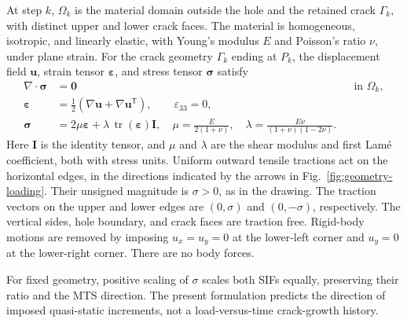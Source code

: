 \documentclass[11pt]{article}
\begin{document}
At step $k$, $\Omega_k$ is the material domain outside the hole and the
retained crack $\Gamma_k$, with distinct upper and lower crack faces.
The material is homogeneous, isotropic, and linearly elastic,
with Young's modulus $E$ and Poisson's ratio $\nu$, under plane
strain. For the crack geometry $\Gamma_k$ ending at $P_k$, the
displacement field $\bm u$, strain tensor $\bm\varepsilon$, and stress
tensor $\bm\sigma$ satisfy
\begin{align}
 \nabla\!\cdot\bm{\sigma}&=\bm0 &&\text{in }\Omega_k,\label{eq:equilibrium}\\
 \bm{\varepsilon}&=\tfrac12(\nabla\bm u+\nabla\bm u^{\mathsf T}),\qquad
 \varepsilon_{33}=0,\label{eq:strain}\\
 \bm{\sigma}&=2\mu\bm{\varepsilon}
       +\lambda\,\operatorname{tr}(\bm{\varepsilon})\bm I,
 \quad \mu=\frac{E}{2(1+\nu)},\quad
 \lambda=\frac{E\nu}{(1+\nu)(1-2\nu)}.\label{eq:constitutive}
\end{align}
Here $\bm I$ is the identity tensor, and $\mu$ and $\lambda$ are the
shear modulus and first Lam\'e coefficient, both with stress units.
Uniform outward tensile tractions act on the horizontal edges, in the
directions indicated by the arrows in Fig.~\ref{fig:geometry-loading}.
Their unsigned magnitude is $\sigma>0$, as in the drawing. The traction
vectors on the upper and lower edges are $(0,\sigma)$ and
$(0,-\sigma)$, respectively. The vertical sides, hole boundary, and
crack faces are traction free. Rigid-body motions are removed by imposing
$u_x=u_y=0$ at the lower-left corner and $u_y=0$ at the lower-right
corner. There are no body forces.

For fixed geometry, positive scaling of $\sigma$ scales both SIFs
equally, preserving their ratio and the MTS direction. The present
formulation predicts the direction of imposed quasi-static increments,
not a load-versus-time crack-growth history.
\end{document}
